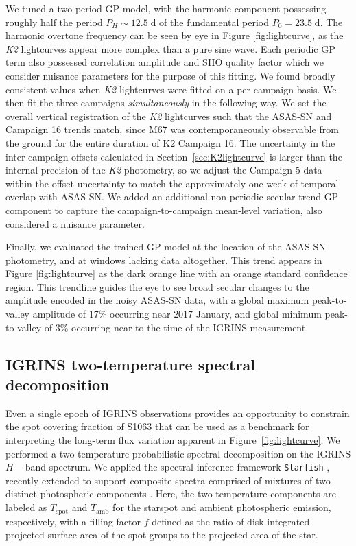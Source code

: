 \documentclass[modern,trackchanges]{aastex631}
\begin{document}
 We tuned a two-period GP model, with the harmonic component possessing roughly half the period $P_H\sim12.5\;\mathrm{d}$ of the fundamental period $P_0=23.5\;\mathrm{d}$.  The harmonic overtone frequency can be seen by eye in Figure \ref{fig:lightcurve}, as the \emph{K2} lightcurves appear more complex than a pure sine wave.  Each periodic GP term also possessed correlation amplitude and SHO quality factor which we consider nuisance parameters for the purpose of this fitting.  We found broadly consistent values when \emph{K2} lightcurves were fitted on a per-campaign basis.  We then fit the three campaigns \emph{simultaneously} in the following way.  We set the overall vertical registration of the \emph{K2} lightcurves such that the ASAS-SN and Campaign 16 trends match, since M67 was contemporaneously observable from the ground for the entire duration of K2 Campaign 16. The uncertainty in the inter-campaign offsets calculated in Section~\ref{sec:K2lightcurve} is larger than the internal precision of the \emph{K2} photometry, so we adjust the Campaign 5 data within the offset uncertainty to match the approximately one week of temporal overlap with ASAS-SN.  We added an additional non-periodic secular trend GP component to capture the campaign-to-campaign mean-level variation, also considered a nuisance parameter.

Finally, we evaluated the trained GP model at the location of the ASAS-SN photometry, and at windows lacking data altogether.  This trend appears in Figure \ref{fig:lightcurve} as the dark orange line with an orange standard confidence region.  This trendline guides the eye to see broad secular changes to the amplitude encoded in the noisy ASAS-SN data, with a global maximum peak-to-valley amplitude of 17\% occurring near 2017 January, and global minimum peak-to-valley of 3\% occurring near to the time of the IGRINS measurement. 


\subsection{IGRINS two-temperature spectral decomposition}

Even a single epoch of IGRINS observations provides an opportunity to constrain the spot covering fraction of S1063 that can be used as a benchmark for interpreting the long-term flux variation apparent in Figure~\ref{fig:lightcurve}. We performed a two-temperature probabilistic spectral decomposition on the IGRINS $H-$band spectrum.  We applied the spectral inference framework \texttt{Starfish} \citep{czekala15}, recently extended to support composite spectra comprised of mixtures of two distinct photospheric components \citep{gullysantiago17}.  Here, the two temperature components are labeled as $T_{\mathrm{spot}}$ and $T_{\mathrm{amb}}$ for the starspot and ambient photospheric emission, respectively, with a filling factor $f$ defined as the ratio of disk-integrated projected surface area of the spot groups to the projected area of the star.
\end{document}
